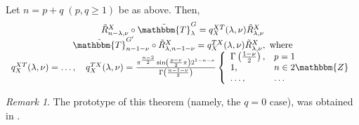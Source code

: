 \documentclass[pdf]{beamer}
\theoremstyle{mystyle}
\theoremstyle{remark}
\newtheorem{remark}{Remark}
\begin{document}
\begin{frame}
  \begin{figure}[H]
    \centering
    \begin{subfigure}[t]{0.3\textwidth}
    \end{subfigure}
    ~ %
    \begin{subfigure}[t]{0.3\textwidth}
    \end{subfigure}
    \end{figure}
    \vspace{-1em}
    \begin{theorem}
	    Let
	$n=p+q\;(p,q\ge1)$ be as above. Then,
	\vspace{-1em}
	\begin{equation*}
		\begin{array}[]{c}
\tilde{R}_{n - \lambda, \nu}^X \circ
\tilde{\mathbbm{T}}_{\lambda}^G = q_X^{X T} (\lambda, \nu)
\tilde{R}^X_{\lambda, \nu} \\
\tilde{\mathbbm{T}}_{n - 1 - \nu}^{G'} \circ
\tilde{R}_{\lambda, n - 1 - \nu}^X = q_X^{T X} (\lambda, \nu)
\tilde{R}_{\lambda, \nu}^X,\mbox{ where}\\
q_X^{X T} (\lambda, \nu) = \ldots,\quad
q_X^{T X} (\lambda, \nu) = \frac{\pi^{\frac{n -
2}{2}} \sin \left( \frac{p - \nu}{2} \pi \right) 2^{1 - n - \nu}}{\Gamma
\left( \frac{n - 1 - \nu}{2} \right)} \left\{ \begin{array}{ll}
  \Gamma \left( \frac{1 - \nu}{2} \right), & p = 1\\
  1, & n \in 2\mathbbm{Z}\\
  \ldots, & \ldots
\end{array} \right.
		\end{array}
	\end{equation*}
	\end{theorem}
\vspace{-0.5em}
	\begin{remark}
		The prototype of this theorem (namely, the $q=0$ case), was obtained in
		\cite[Thm. 12.6]{kobayashi2015symmetry}.
	\end{remark}
\end{frame}
\end{document}

